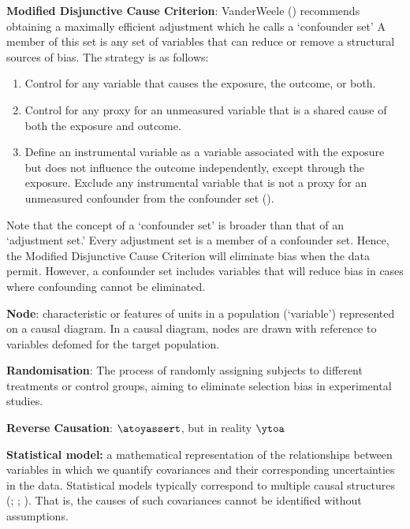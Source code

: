 \documentclass[
  singlecolumn]{article}
\providecommand{\tightlist}{%
  \setlength{\itemsep}{0pt}\setlength{\parskip}{0pt}}\usepackage{longtable,booktabs,array}
\begin{document}
\textbf{Modified Disjunctive Cause Criterion}: VanderWeele
() recommends obtaining a maximally
efficient adjustment which he calls a `confounder set' A member of this
set is any set of variables that can reduce or remove a structural
sources of bias. The strategy is as follows:

\begin{enumerate}
\def\labelenumi{\alph{enumi}.}
\tightlist
\item
  Control for any variable that causes the exposure, the outcome, or
  both.
\item
  Control for any proxy for an unmeasured variable that is a shared
  cause of both the exposure and outcome.
\item
  Define an instrumental variable as a variable associated with the
  exposure but does not influence the outcome independently, except
  through the exposure. Exclude any instrumental variable that is not a
  proxy for an unmeasured confounder from the confounder set
  ().
\end{enumerate}

Note that the concept of a `confounder set' is broader than that of an
`adjustment set.' Every adjustment set is a member of a confounder set.
Hence, the Modified Disjunctive Cause Criterion will eliminate bias when
the data permit. However, a confounder set includes variables that will
reduce bias in cases where confounding cannot be eliminated.

\textbf{Node}: characteristic or features of units in a population
(`variable') represented on a causal diagram. In a causal diagram, nodes
are drawn with reference to variables defomed for the target population.

\textbf{Randomisation}: The process of randomly assigning subjects to
different treatments or control groups, aiming to eliminate selection
bias in experimental studies.

\textbf{Reverse Causation}: \(\atoyassert\), but in reality \(\ytoa\)

\textbf{Statistical model:} a mathematical representation of the
relationships between variables in which we quantify covariances and
their corresponding uncertainties in the data. Statistical models
typically correspond to multiple causal structures
(;
;
).
That is, the causes of such covariances cannot be identified without
assumptions.
\end{document}
